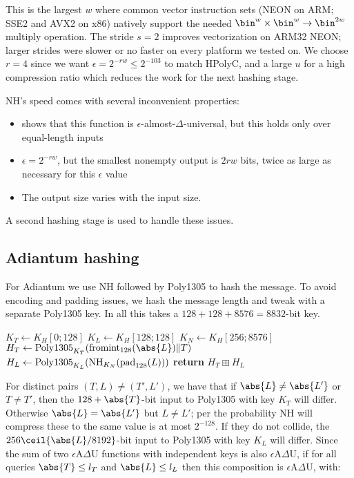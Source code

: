 \documentclass[eprint.tex]{subfiles}
\begin{document}
This is the largest $w$ where common vector instruction sets (NEON on ARM; SSE2
and AVX2 on x86) natively support the needed $\bin^w \times \bin^w \rightarrow
\bin^{2w}$ multiply operation.  The stride $s=2$ improves vectorization on
ARM32 NEON; larger strides were slower or no faster on every platform we tested
on. We choose $r=4$ since we want $\epsilon = 2^{-rw} \leq 2^{-103}$ to match
HPolyC, and a large $u$ for a high compression ratio which reduces the work for
the next hashing stage.

NH's speed comes with several inconvenient properties:
\begin{itemize}
    \item \cite{umac2} shows that this function is $\epsilon$-almost-$\Delta$-universal, but this
        holds only over equal-length inputs
    \item $\epsilon = 2^{-rw}$, but the smallest nonempty output is $2rw$ bits, twice as large
        as necessary for this $\epsilon$ value
    \item The output size varies with the input size.
\end{itemize}
A second hashing stage is used to handle these issues.

\subsection{Adiantum hashing}

For Adiantum we use NH followed by Poly1305 to hash the message.
To avoid encoding and padding issues, we hash the message length and tweak with
a separate Poly1305 key.
In all this takes a $128 + 128 + 8576 = 8832$-bit key.

\begin{algorithmic}[0]
    \State $K_T \gets K_H[0;128]$
    \State $K_L \gets K_H[128;128]$
    \State $K_N \gets K_H[256;8576]$
    \State $H_T \gets \Polydjb_{K_T}(\fromint_{128}(\abs{L}) \Concat T)$
    \State $H_L \gets \operatorname{Poly1305}_{K_L}(\operatorname{NH}_{K_N}(\operatorname{pad}_{128}(L)))$
    \State \textbf{return} $H_T \boxplus H_L$
    \EndProcedure
\end{algorithmic}

For distinct pairs $(T,L) \neq (T', L')$, we have that if $\abs{L} \neq \abs{L'}$ or $T \neq T'$,
then the $128 + \abs{T}$-bit input to Poly1305 with key $K_T$ will differ.
Otherwise $\abs{L} = \abs{L'}$ but $L \neq L'$;
per \cite{umac2} the probability NH will compress these to the same value is at most
$2^{-128}$. If they do not collide, the $256\ceil{\abs{L}/8192}$-bit input to Poly1305 with key $K_L$
will differ. Since the sum of two $\epsilon$A$\Delta$U functions with independent keys is also
$\epsilon$A$\Delta$U, if for all queries $\abs{T} \leq l_T$ and $\abs{L} \leq l_L$ then
this composition is  $\epsilon$A$\Delta$U, with:
\end{document}
